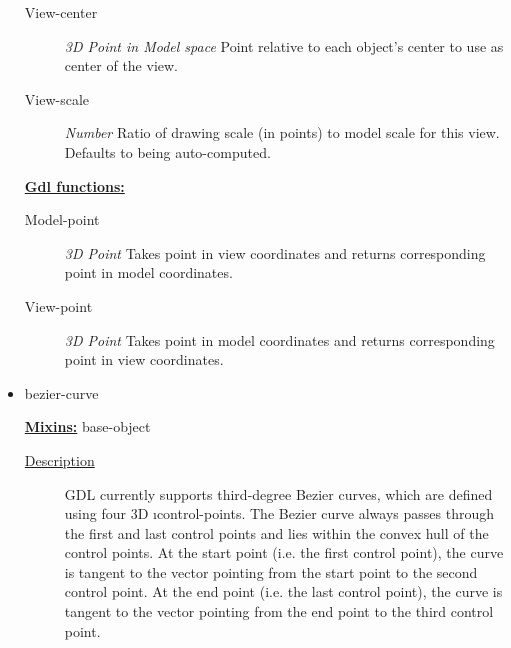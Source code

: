 \documentclass [11pt]{book}
\begin{document}
\begin{itemize}
\begin{description}
\item [View-center]
\emph{3D Point in Model space} Point relative to each object's center to use as center of the view.


\item [View-scale]
\emph{Number} Ratio of drawing scale (in points) to model scale for this view. Defaults to being auto-computed.


\end{description}






\textbf{
\underline{Gdl functions:}}

\begin{description}

\item [Model-point]
\emph{3D Point} Takes point in view coordinates and returns corresponding point in model coordinates.


\item [View-point]
\emph{3D Point} Takes point in model coordinates and returns corresponding point in view coordinates.


\end{description}







\item {}bezier-curve


\textbf{
\underline{Mixins:}} base-object





\begin{description}

\item [
\underline{Description}]


GDL currently supports third-degree Bezier curves, which are 
defined using four 3D 
\i{control-points}. The Bezier curve always passes 
through the first and last control points and lies within the convex hull of the control 
points. At the start point (i.e. the first control point), the curve is tangent 
to the vector pointing from the start point to the second control point. 
At the end point (i.e. the last control point), the curve is tangent to the 
vector pointing from the end point to the third control point.




\end{description}
\end{itemize}
\end{document}
